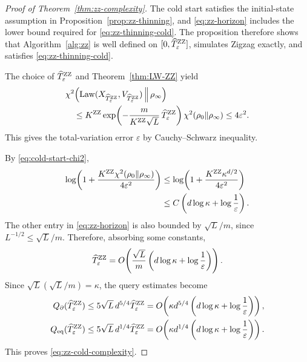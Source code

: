 \documentclass{amsart}
\theoremstyle{plain}
\theoremstyle{definition}
\theoremstyle{remark}
\newcommand{\1}{\mathbf 1}
\DeclareMathOperator{\Law}{Law}
\newcommand{\zz}{{\rm ZZ}}
\begin{document}
\begin{proof}[Proof of Theorem~\ref{thm:zz-complexity}]
The cold start satisfies the initial-state assumption in
Proposition~\ref{prop:zz-thinning}, and \eqref{eq:zz-horizon} includes the
lower bound required for \eqref{eq:zz-thinning-cold}.  The proposition
therefore shows that Algorithm~\ref{alg:zz} is well defined on
$[0,\widehat T_\varepsilon^{\zz}]$, simulates Zigzag exactly, and satisfies
\eqref{eq:zz-thinning-cold}.

The choice of $\widehat T_\varepsilon^{\zz}$ and
Theorem~\ref{thm:LW-ZZ} yield
\[
\begin{aligned}
&\chi^2\!\left(
  \Law(X_{\widehat T_\varepsilon^{\zz}},
       V_{\widehat T_\varepsilon^{\zz}})
  \,\middle\Vert\,\rho_\infty\right)\\
&\quad\le
K^{\zz}
\exp\!\left(
  -\frac{m}{K^{\zz}\sqrt L}\,
   \widehat T_\varepsilon^{\zz}
\right)
\chi^2(\rho_0\Vert\rho_\infty)
\le4\varepsilon^2.
\end{aligned}
\]
This gives the total-variation error $\varepsilon$ by Cauchy–Schwarz inequality.

By \eqref{eq:cold-start-chi2},
\[
\begin{aligned}
\log\!\left(
  1+\frac{K^{\zz}\chi^2(\rho_0\Vert\rho_\infty)}
           {4\varepsilon^2}
\right)
&\le
\log\!\left(
  1+\frac{K^{\zz}\kappa^{d/2}}{4\varepsilon^2}
\right)\\
&\le C\left(d\log\kappa+\log\frac1\varepsilon\right).
\end{aligned}
\]
The other entry in \eqref{eq:zz-horizon} is also bounded by
$\sqrt L/m$, since $L^{-1/2}\le\sqrt L/m$.  Therefore, absorbing some
constants,
\[
        \widehat T_\varepsilon^{\zz}
        =O\!\left(\frac{\sqrt L}{m}
          \left(d\log\kappa+\log\frac1\varepsilon\right)\right).
\]
Since $\sqrt L(\sqrt L/m)=\kappa$, the query estimates become
\[
\begin{aligned}
        Q_\partial(\widehat T_\varepsilon^{\zz})
        &\le5\sqrt L\,d^{5/4}\widehat T_\varepsilon^{\zz}
        =O\!\left(
          \kappa d^{5/4}
          \left(d\log\kappa+\log\frac1\varepsilon\right)\right),\\
        Q_{\rm eq}(\widehat T_\varepsilon^{\zz})
        &\le5\sqrt L\,d^{1/4}\widehat T_\varepsilon^{\zz}
        =O\!\left(
          \kappa d^{1/4}
          \left(d\log\kappa+\log\frac1\varepsilon\right)\right).
\end{aligned}
\]
This proves \eqref{eq:zz-cold-complexity}.
\end{proof}



\end{document}
